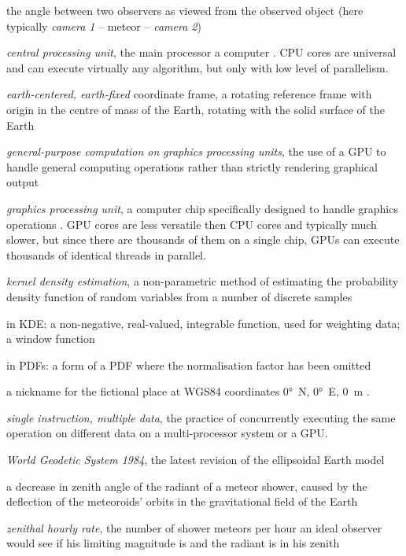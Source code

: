 \begin{description}[labelindent=0mm, leftmargin=40mm]
    \item[convergence angle]
        the angle between two observers as viewed from the observed object (here typically \emph{camera 1} -- meteor -- \emph{camera 2})
    \item[CPU]
        \emph{central processing unit}, the main processor a computer \cite{techterms}.
        CPU cores are universal and can execute virtually any algorithm, but only with low level of parallelism.
    \item[ECEF]
        \emph{earth-centered, earth-fixed} coordinate frame, a rotating reference frame with origin
        in the centre of mass of the Earth, rotating with the solid surface of the Earth \citep{ecef}
    \item[GPGPU]
        \emph{general-purpose computation on graphics processing units},
        the use of a GPU to handle general computing operations rather than strictly rendering graphical output \citep{techterms}
    \item[GPU]
        \emph{graphics processing unit}, a computer chip specifically designed to handle graphics operations \citep{techterms}.
        GPU cores are less versatile then CPU cores and typically much slower, but since there are thousands of them on a single
        chip, GPUs can execute thousands of identical threads in parallel.
    \item[KDE]
        \emph{kernel density estimation}, a non-parametric method of estimating the probability density function
        of random variables from a number of discrete samples \citep{kde}
    \item[kernel]
        in KDE: a non-negative, real-valued, integrable function, used for weighting data; a window function
    \item[kernel]
        in PDFs: a form of a PDF where the normalisation factor has been omitted
    \item[Null Island]
        a nickname for the fictional place at WGS84 coordinates \ang{0}~N, \ang{0}~E, \SI{0}{\metre} \citep{null-island}.
    \item[SIMD]
        \emph{single instruction, multiple data}, the practice of concurrently executing the same operation on
        different data on a multi-processor system or a GPU.
    \item[WGS84]
        \emph{World Geodetic System 1984}, the latest revision of the ellipsoidal Earth model \citep{nima-wgs84}
    \item[zenith attraction]
        a decrease in zenith angle of the radiant of a meteor shower, caused by the deflection of the meteoroids' orbits in the
        gravitational field of the Earth \citep{lovell1954}
    \item[ZHR]
        \emph{zenithal hourly rate}, the number of shower meteors per hour an ideal observer would see
            if his limiting magnitude is  and the radiant is in his zenith \citep{imo-glossary}
\end{description}
